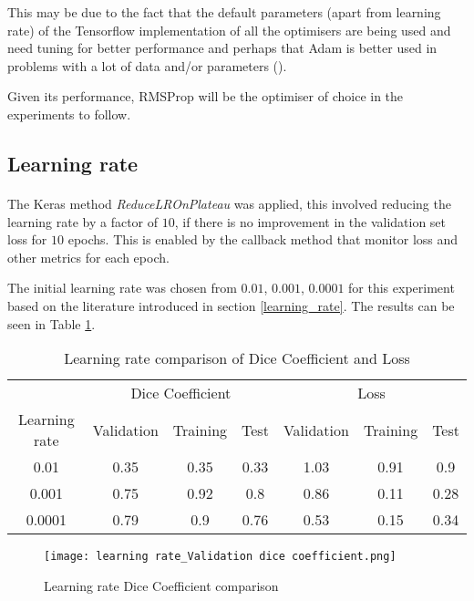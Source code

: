 This may be due to the fact that the default parameters (apart from learning rate) of the Tensorflow implementation of all the optimisers are being used and need tuning for better performance and perhaps that \gls{Adam} is better used in problems with a lot of data and/or parameters (\cite{kingma2017adam}). 

Given its performance, \gls{RMSProp} will be the optimiser of choice in the experiments to follow.
\subsection{Learning rate}
\paragraph{}
The Keras method \textit{ReduceLROnPlateau} was applied, this involved reducing the learning rate by a factor of $10$, if there is no improvement in the validation set loss for $10$ epochs. This is enabled by the callback method that monitor loss and other metrics for each epoch.

The initial learning rate was chosen from $0.01$, $0.001$, $0.0001$ for this experiment based on the literature introduced in section \ref{learning_rate}. The results can be seen in Table \ref{tab_lr}.

\begin{table}[ht!] 
    \begin{center}
    \begin{tabular}{ccccccc} 
    \toprule
       & \multicolumn{3}{c}{Dice Coefficient}     & \multicolumn{3}{c}{Loss} \\
    Learning rate & Validation & Training & Test & Validation & Training & Test \\ \midrule
    0.01 & 0.35 & 0.35 & 0.33 & 1.03 & 0.91 & 0.9  \\ 0.001 & 0.75 & 0.92 & 0.8 & 0.86 & 0.11 & 0.28  \\ \rowcolor{lightgray} 0.0001 & 0.79 & 0.9 & 0.76 & 0.53 & 0.15 & 0.34  \\
\bottomrule
    \end{tabular}
  \end{center} 
  \caption{Learning rate comparison of Dice Coefficient and Loss}\label{tab_lr}
\end{table}
\begin{figure}[hbt!]

\centering
    \texttt{[image: learning rate\_Validation dice coefficient.png]}
    \caption{Learning rate Dice Coefficient comparison}
    \label{lr_dice}
\end{figure}

